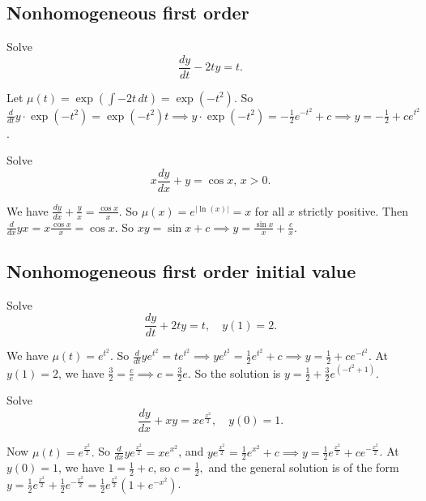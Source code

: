 \subsection{Nonhomogeneous first order}
\begin{prob}
    Solve \[
    \frac{dy}{dt}-2ty=t.
    \] 
\end{prob}
\begin{solution}
    Let $\mu(t)= \exp\left( \int -2t \, dt \right) =\exp\left( -t^2 \right) $. So $\frac{d}{dt} y\cdot \exp\left( -t^2 \right) =\exp\left( -t^2 \right) t \implies y\cdot \exp(-t^2)=-\frac{1}{2}e^{-t^2}+c\implies y=-\frac{1}{2}+ce^{t^2}$.
\end{solution}
\begin{prob}
    Solve \[
   x \frac{dy}{dx}+y=\cos x,\, x>0. 
    \] 
\end{prob}
\begin{solution}
    We have $\frac{dy}{dx}+\frac{y}{x}=\frac{\cos x}{x}$. So $\mu(x)=e^{|\ln(x)|}=x$ for all $x$ strictly positive. Then $\frac{d}{dx}yx=x  \frac{\cos x}{x}=\cos x$. So $xy=\sin x +c\implies y= \frac{\sin x}{x}+\frac{c}{x}$.
\end{solution}
\subsection{Nonhomogeneous first order initial value}
\begin{prob}
    Solve \[
        \frac{dy}{dt}+2ty=t,\quad y(1)=2.
    \] 
\end{prob}
\begin{solution}
    We have $\mu(t)=e^{t^2}$. So $\frac{d}{dt} y e^{t^2}=te^{t^2}\implies ye^{t^2}=\frac{1}{2}e^{t^2}+c\implies y=\frac{1}{2}+ce^{-t^2}.$ At $y(1)=2$, we have $\frac{3}{2}=\frac{c}{e}\implies c=\frac{3}{2}e$. So the solution is $y=\frac{1}{2}+\frac{3}{2}e^{(-t^2+1)}$.
\end{solution}
\begin{prob}
    Solve \[
        \frac{dy}{dx}+xy=xe^{\frac{x^2}{2}},\quad y(0)=1.
    \] 
\end{prob}
\begin{solution}
    Now $\mu(t)=e^{\frac{x^2}{2}}.$ So $\frac{d}{dx}ye^{\frac{x^2}{2}}=xe^{x^2}$, and $ye^{\frac{x^2}{2}}=\frac{1}{2}e^{x^2}+c\implies y=\frac{1}{2}e^{\frac{x^2}{2}}+ce^{-\frac{x^2}{2}}$. At $y(0)=1$, we have $1=\frac{1}{2}+c$, so $c=\frac{1}{2},$ and the general solution is of the form $y=\frac{1}{2}e^{\frac{x^2}{2}}+\frac{1}{2}e^{-\frac{x^2}{2}}=\frac{1}{2}e^{\frac{x^2}{2}}\left( 1+e^{-x^2} \right) $.
\end{solution}
